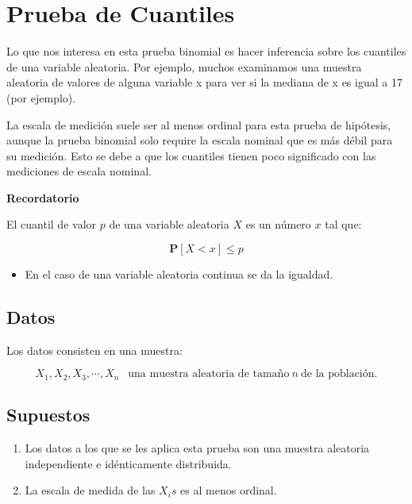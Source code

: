 \documentclass[
  a4paper,
  oneside,
  openany]{book}
\providecommand{\tightlist}{%
  \setlength{\itemsep}{0pt}\setlength{\parskip}{0pt}}
\begin{document}
\hypertarget{prueba-de-cuantiles}{%
\chapter{Prueba de Cuantiles}\label{prueba-de-cuantiles}}

Lo que nos interesa en esta prueba binomial es hacer inferencia sobre los cuantiles de una variable aleatoria. Por ejemplo, muchos examinamos una muestra aleatoria de valores de alguna variable x para ver si la mediana de x es igual a 17 (por ejemplo).

La escala de medición suele ser al menos ordinal para esta prueba de hipótesis, aunque la prueba binomial solo require la escala nominal que es más débil para su medición. Esto se debe a que los cuantiles tienen poco significado con las mediciones de escala nominal.

\textbf{Recordatorio}

El cuantil de valor \(p\) de una variable aleatoria \(X\)
es un número \(x\) tal que:

\[ \mathbf{P}[X < x]\leq p\]

\begin{itemize}
\tightlist
\item
  En el caso de una variable aleatoria continua se da la igualdad.
\end{itemize}

\hypertarget{datos-1}{%
\section{Datos}\label{datos-1}}

Los datos consisten en una muestra:

\[X_{1},X_{2},X_{3},\cdots,X_{n}  \  \ \mbox{ una muestra aleatoria de tamaño} \ n \  \mbox{de la población}.\]

\hypertarget{supuestos-1}{%
\section{Supuestos}\label{supuestos-1}}

\begin{enumerate}
\def\labelenumi{\arabic{enumi})}
\item
  Los datos a los que se les aplica esta prueba son una muestra aleatoria independiente e idénticamente distribuida.
\item
  La escala de medida de las \(X_{i}s\) es al menos ordinal.
\end{enumerate}
\end{document}
